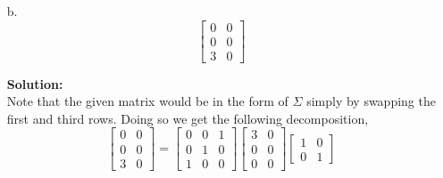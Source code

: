 \documentclass[12pt]{article}
\makeatletter
\theoremstyle{homework}
\newenvironment{exercise}[1]
{\def\@currentlabel{#1}\exercisecore}
{\endexercisecore}
\newcommand{\localhead}[1]{\par\smallskip\noindent\textbf{#1}\nobreak\\}%
\newcommand\solution{\localhead{Solution:}}
\makeatother
\begin{document}
\begin{exercise}{P10}
\begin{enumerate}
    \item[b.]
    \begin{equation*}
    \begin{bmatrix}
      0 & 0\\
      0 & 0\\
      3 & 0
    \end{bmatrix} 
  \end{equation*}
  \solution Note that the given matrix would be in the form of $\Sigma$ simply by swapping the first and 
  third rows. Doing so we get the following decomposition, 
  \begin{equation*}
    \begin{bmatrix}
      0 & 0\\
      0 & 0\\
      3 & 0
    \end{bmatrix}  = 
    \begin{bmatrix}
      0 & 0 & 1\\
      0 & 1 & 0\\
      1 & 0 & 0
    \end{bmatrix} 
    \begin{bmatrix}
      3 & 0\\
      0 & 0\\
      0 & 0
    \end{bmatrix}
    \begin{bmatrix}
      1 & 0\\
      0 & 1
    \end{bmatrix}
  \end{equation*}
  \vspace{.15in}





\end{enumerate}
\end{exercise}
\end{document}
